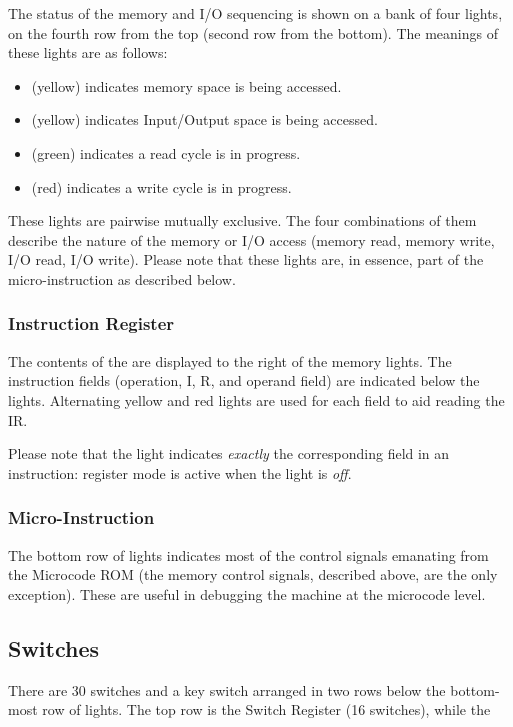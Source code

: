 The status of the memory and I/O sequencing is shown on a bank of four lights,
on the fourth row from the top (second row from the bottom). The meanings of
these lights are as follows:

\begin{itemize}
\item {} (yellow) indicates memory space is being accessed.
\item {} (yellow) indicates Input/Output space is being accessed.
\item {} (green) indicates a read cycle is in progress.
\item {} (red) indicates a write cycle is in progress.
\end{itemize}

These lights are pairwise mutually exclusive. The four combinations of them
describe the nature of the memory or I/O access (memory read, memory write, I/O
read, I/O write). Please note that these lights are, in essence, part of the
micro-instruction as described below.

\subsubsection{Instruction Register}

The contents of the \IR{} are displayed to the right of the memory lights. The
instruction fields (operation, I, R, and operand field) are indicated below the
lights. Alternating yellow and red lights are used for each field to aid
reading the IR.

Please note that the  light indicates {\em exactly\/} the corresponding
field in an instruction: register mode is active when the light is {\em off}.

\subsubsection{Micro-Instruction}

The bottom row of lights indicates most of the control signals emanating from
the Microcode ROM (the memory control signals, described above, are the only
exception). These are useful in debugging the machine at the microcode level.

\subsection{Switches}

There are 30 switches and a key switch arranged in two rows below the
bottom-most row of lights. The top row is the Switch Register (16
switches), while the 

